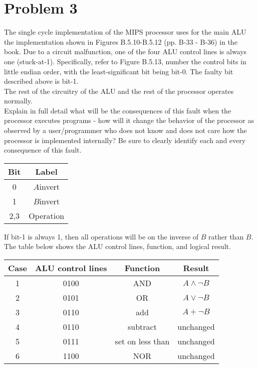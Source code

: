 \documentclass[10pt,letterpaper]{article}
\begin{document}
\section{Problem 3}
The single cycle implementation of the MIPS processor uses for the main ALU the implementation shown in Figures B.5.10-B.5.12 (pp. B-33 - B-36) in the book. Due to a circuit malfunction, one of the four ALU control lines is always one (stuck-at-1). Specifically, refer to Figure B.5.13, number the control bits in little endian order, with the least-significant bit being bit-0. The faulty bit described above is bit-1.\\
The rest of the circuitry of the ALU and the rest of the processor operates normally.\\
Explain in full detail what will be the consequences of this fault when the processor executes programs - how will it change the behavior of the processor as observed by a user/programmer who does not know and does not care how the processor is implemented internally? Be sure to clearly identify each and every consequence of this fault.
\begin{center}
\begin{tabular} { |c|c| }
\hline
\textbf{Bit} & \textbf{Label} \\
\hline
0 & $A$invert \\
\hline
1 & $B$invert \\
\hline
2,3 & Operation \\
\hline
\end{tabular}
\end{center}
If bit-1 is always 1, then all operations will be on the inverse of $B$ rather than $B$. The table below shows the ALU control lines, function, and logical result.
\begin{center}
\begin{tabular} { |c|c|c|c| }
\hline
\textbf{Case} & \textbf{ALU control lines} & \textbf{Function} & \textbf{Result} \\
\hline
1 & 0100 & AND & $A \land \neg B$ \\
\hline
2 & 0101 & OR & $A \lor \neg B$ \\
\hline
3 & 0110 & add & $A + \neg B$ \\
\hline
4 & 0110 & subtract & unchanged \\
\hline
5 & 0111 & set on less than & unchanged \\
\hline
6 & 1100 & NOR & unchanged \\
\hline
\end{tabular}
\end{center}
\end{document}
